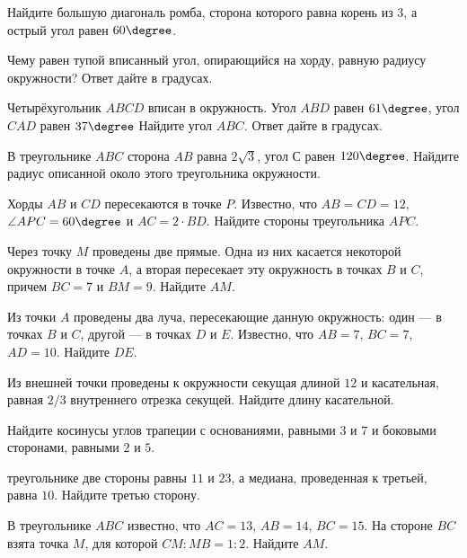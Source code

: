 \begin{class}[number=8]
	\begin{listofex}
		\item Найдите большую диагональ ромба, сторона которого равна  корень из \( 3 \), а острый угол равен \( 60\degree \).
		\item Чему равен тупой вписанный угол, опирающийся на хорду, равную радиусу окружности? Ответ дайте в градусах.
		\item Четырёхугольник \( ABCD \) вписан в окружность. Угол \( ABD \) равен \( 61\degree \), угол \( CAD \) равен \( 37\degree \) Найдите угол \( ABC \). Ответ дайте в градусах.
		\item В треугольнике \( ABC \) сторона \( AB \) равна \( 2\sqrt{3} \), угол \( С \) равен \( 120\degree \). Найдите радиус описанной около этого треугольника окружности.
		\item Хорды \( AB \) и \( CD \) пересекаются в точке \( P \).
		Известно, что \( AB = CD = 12 \), \( \angle APC = 60\degree\) и \( AC = 2 \cdot BD \).
		Найдите стороны треугольника \( APC \).
		\item Через точку \( M \) проведены две прямые.
		Одна из них касается некоторой окружности в точке \( A \),
		а вторая пересекает эту окружность в точках \( B \) и \( C \),
		причем \( BC = 7 \) и \( BM = 9 \).
		Найдите \( AM \).
		\item Из точки \( A \) проведены два луча, пересекающие данную
		окружность: один --- в точках \( B \) и \( C \), другой --- в точках \( D \) и \( E \).
		Известно, что \( AB = 7 \), \( BC = 7 \), \( AD = 10 \). Найдите \( DE \).
		\item Из внешней точки проведены к окружности секущая
		длиной \( 12 \) и касательная,
		равная \( 2/3 \) внутреннего отрезка секущей.
		Найдите длину касательной.
		\item Найдите косинусы углов трапеции с основаниями,
		равными \( 3 \) и \( 7 \) и боковыми сторонами, равными \( 2 \) и \( 5 \).
		\item треугольнике две стороны равны \( 11 \) и \( 23 \),
		а медиана, проведенная к третьей, равна \( 10 \).
		Найдите третью сторону.
		\item В треугольнике \( ABC \) известно, что \( AC = 13 \),
		\( AB = 14 \), \( BC = 15 \). На стороне \( BC \) взята точка \( M \),
		для которой \( CM : MB = 1 : 2 \). Найдите \( AM \).
	\end{listofex}
\end{class}
